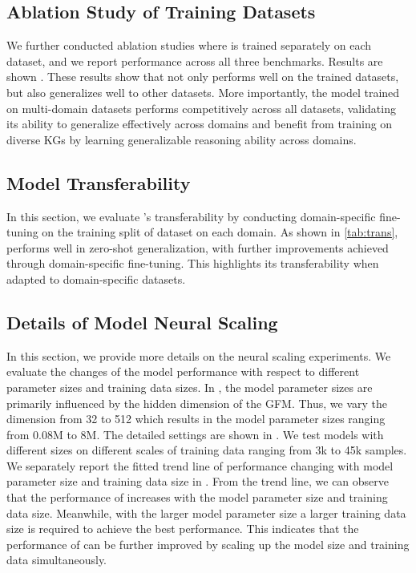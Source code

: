 

\subsection{Ablation Study of Training Datasets}\label{app:training_data_ablation}
We further conducted ablation studies where \ourmethod is trained separately on each dataset, and we report performance across all three benchmarks. Results are shown . These results show that \ourmethod not only performs well on the trained datasets, but also generalizes well to other datasets.  More importantly, the model trained on multi-domain datasets performs competitively across all datasets, validating its ability to generalize effectively across domains and benefit from training on diverse KGs by learning generalizable reasoning ability across domains.



\subsection{Model Transferability}\label{app:trans}

In this section, we evaluate \ourmethod's transferability by conducting domain-specific fine-tuning on the training split of dataset on each domain. As shown in \ref{tab:trans}, \ourmethod performs well in zero-shot generalization, with further improvements achieved through domain-specific fine-tuning. This highlights its transferability when adapted to domain-specific datasets.


\subsection{Details of Model Neural Scaling}\label{app:scaling}
In this section, we provide more details on the neural scaling experiments. We evaluate the changes of the model performance with respect to different parameter sizes and training data sizes. In \ourmethod, the model parameter sizes are primarily influenced by the hidden dimension of the GFM. Thus, we vary the dimension from 32 to 512 which results in the model parameter sizes ranging from 0.08M to 8M. The detailed settings are shown in . We test models with different sizes on different scales of training data ranging from 3k to 45k samples. We separately report the fitted trend line of performance changing with model parameter size and training data size in . From the trend line, we can observe that the performance of \ourmethod increases with the model parameter size and training data size. Meanwhile, with the larger model parameter size a larger training data size is required to achieve the best performance. This indicates that the performance of \ourmethod can be further improved by scaling up the model size and training data simultaneously.

